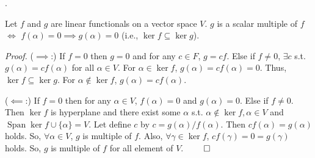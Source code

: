 \documentclass[8pt]{beamer}
\newcommand{\ti}[1]{\textit{#1}}
\newcommand{\Span}{\operatorname{Span}}
\begin{document}
\begin{frame}{.}
    \begin{lemma} \label{lem:1}
        Let $f$ and $g$ are linear functionals on a vector space $V$.
        $g$ is a scalar multiple of $f$ $\iff$ $f(\alpha) = 0 \implies g(\alpha) = 0$ (i.e., $\ker f \subseteq \ker g$).
    \end{lemma}
    \ti{Proof.}
    ($\implies$:) If $f = 0$ then $g = 0$ and for any $c \in F$, $g = c f$.
    Else if $f \neq 0$, $\exists c$ s.t. $g(\alpha) = c f(\alpha)$ for all $\alpha \in V$.
    For $\alpha \in \ker f$, $g(\alpha) = c f(\alpha) = 0$.
    Thus, $\ker f  \subseteq \ker g$.
    For $\alpha \notin \ker f$, $g(\alpha) = cf(\alpha)$.

    ($\impliedby$:)
    If $f = 0$ then for any $\alpha \in V$, $f(\alpha) = 0$ and $g(\alpha) = 0$.
    Else if $f \neq 0$. Then $\ker f$ is hyperplane and there exist some $\alpha$ s.t. $\alpha \notin \ker f, \alpha \in V$ and $\Span \ker f \cup \{\alpha\} = V$.
    Let define $c$ by $c = g(\alpha)/ f(\alpha)$.
    Then $cf(\alpha) = g(\alpha)$ holds.
    So, $\forall \alpha \in V$, $g$ is multiple of $f$.
    Also, $\forall \gamma \in \ker f$, $c f(\gamma) = 0 = g(\gamma)$ holds.
    So, $g$ is multiple of $f$ for all element of $V$.
    $\qed$
\end{frame}
\end{document}
